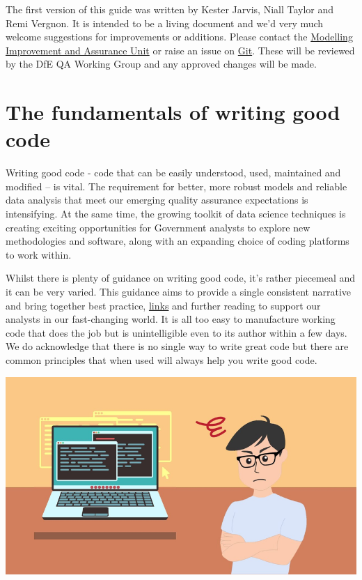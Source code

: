 \documentclass[
]{book}
\begin{document}
The first version of this guide was written by Kester Jarvis, Niall Taylor and Remi Vergnon. It is intended to be a living document and we'd very much welcome suggestions for improvements or additions. Please contact the \href{mailto:modellingandqa@Educationgovuk.onmicrosoft.com?subject=Good\%20coding\%20practice}{Modelling Improvement and Assurance Unit} or raise an issue on \href{https://github.com/dfe-analytical-services/good-code-practice}{Git}. These will be reviewed by the DfE QA Working Group and any approved changes will be made.

\hypertarget{the-fundamentals-of-writing-good-code}{%
\chapter{The fundamentals of writing good code}\label{the-fundamentals-of-writing-good-code}}

Writing good code - code that can be easily understood, used, maintained and modified -- is vital. The requirement for better, more robust models and reliable data analysis that meet our emerging quality assurance expectations is intensifying. At the same time, the growing toolkit of data science techniques is creating exciting opportunities for Government analysts to explore new methodologies and software, along with an expanding choice of coding platforms to work within.

Whilst there is plenty of guidance on writing good code, it's rather piecemeal and it can be very varied. This guidance aims to provide a single consistent narrative and bring together best practice, \protect\hyperlink{links}{links} and further reading to support our analysts in our fast-changing world. It is all too easy to manufacture working code that does the job but is unintelligible even to its author within a few days. We do acknowledge that there is no single way to write great code but there are common principles that when used will always help you write good code.

\includegraphics{pictures/confused.png}
\end{document}
